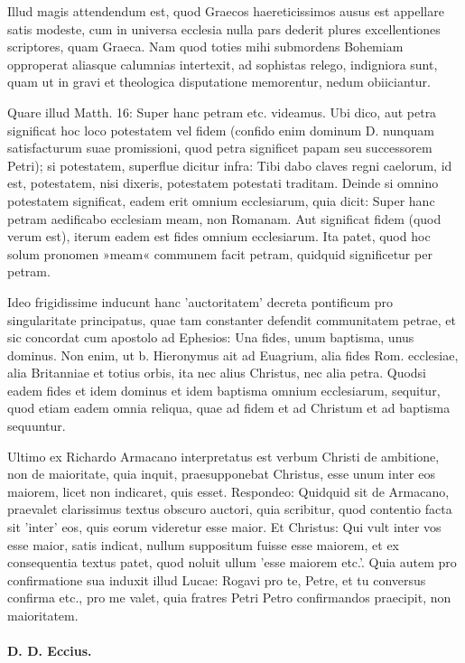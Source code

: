 Illud magis attendendum est, quod Graecos haereticissimos ausus est appellare satis modeste, cum in universa ecclesia nulla pars dederit plures excellentiones scriptores, quam Graeca. Nam quod toties mihi submordens Bohemiam opproperat aliasque calumnias intertexit, ad sophistas relego, indigniora sunt, quam ut in gravi et theologica disputatione memorentur, nedum obiiciantur.

Quare illud Matth. 16: Super hanc petram etc. videamus. Ubi dico, aut petra significat hoc loco potestatem vel fidem (confido enim dominum D. nunquam satisfacturum suae promissioni, quod petra significet papam seu successorem Petri); si potestatem, superflue dicitur infra: Tibi dabo claves regni caelorum, id est, potestatem, nisi dixeris, potestatem potestati traditam. Deinde si omnino potestatem significat, eadem erit omnium ecclesiarum, quia dicit: Super hanc petram aedificabo ecclesiam meam, non Romanam. Aut significat fidem (quod verum est), iterum eadem est fides omnium ecclesiarum. Ita patet, quod hoc solum pronomen »meam« communem facit petram, quidquid significetur per petram.

Ideo frigidissime inducunt hanc 'auctoritatem' decreta pontificum pro singularitate principatus, quae tam constanter defendit communitatem petrae, et sic concordat cum apostolo ad Ephesios: Una fides, unum baptisma, unus dominus. Non enim, ut b. Hieronymus ait ad Euagrium, alia fides Rom. ecclesiae, alia Britanniae et totius orbis, ita nec alius Christus, nec alia petra. Quodsi eadem fides et idem dominus et idem baptisma omnium ecclesiarum, sequitur, quod etiam eadem omnia reliqua, quae ad fidem et ad Christum et ad baptisma sequuntur.

Ultimo ex Richardo Armacano interpretatus est verbum Christi de ambitione, non de maioritate, quia inquit, praesupponebat Christus, esse unum inter eos maiorem, licet non indicaret, quis esset. Respondeo: Quidquid sit de Armacano, praevalet clarissimus textus obscuro auctori, quia scribitur, quod contentio facta sit 'inter' eos, quis eorum videretur esse maior. Et Christus: Qui vult inter vos esse maior, satis indicat, nullum suppositum fuisse esse maiorem, et ex consequentia textus patet, quod noluit ullum 'esse maiorem etc.'. Quia autem pro confirmatione sua induxit illud Lucae: Rogavi pro te, Petre, et tu conversus confirma etc., pro me valet, quia fratres Petri Petro confirmandos praecipit, non maioritatem.

\marginpar{\small[273]}
\paragraph*{D. D. Eccius.}


